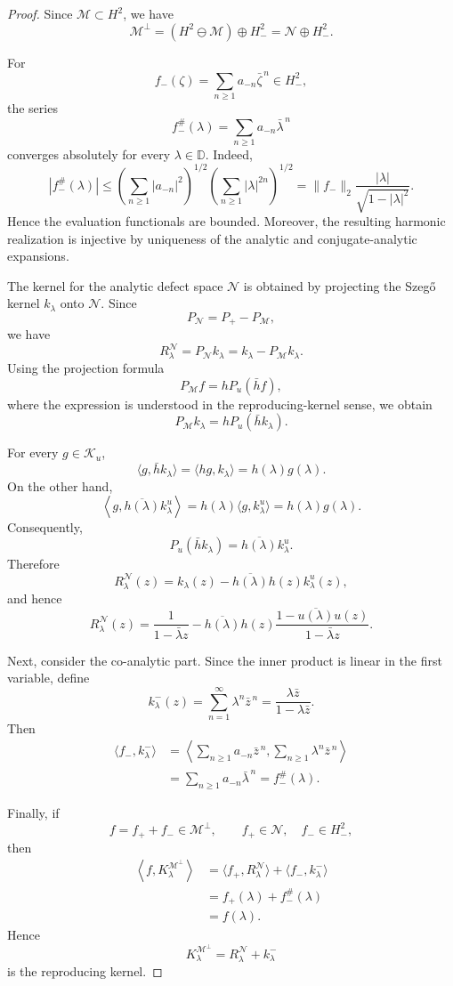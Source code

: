 \documentclass[10pt,a4paper]{amsart}
\def \D{\mathbb{D}}
\newcommand{\clm}{\mathcal{M}}
\newcommand{\cln}{\mathcal{N}}
\newcommand{\clk}{\mathcal{K}}
\numberwithin{equation}{section}
\begin{document}
\begin{proof}
Since $\clm\subset H^2$, we have
\[
\clm^\perp
=(H^2\ominus\clm)\oplus H_{-}^2
=\cln\oplus H_{-}^2.
\]

For
\[
f_{-}(\zeta)=\sum_{n\geq1}a_{-n}\bar\zeta^{\,n}\in H_{-}^2,
\]
the series
\[
f_{-}^\#(\lambda)
=
\sum_{n\geq1}a_{-n}\bar\lambda^{\,n}
\]
converges absolutely for every $\lambda\in\D$. Indeed,
\[
|f_{-}^\#(\lambda)|
\leq
\left(\sum_{n\geq1}|a_{-n}|^2\right)^{1/2}
\left(\sum_{n\geq1}|\lambda|^{2n}\right)^{1/2}
=
\|f_{-}\|_2
\frac{|\lambda|}{\sqrt{1-|\lambda|^2}}.
\]
Hence the evaluation functionals are bounded. Moreover, the resulting
harmonic realization is injective by uniqueness of the analytic and
conjugate-analytic expansions.

The kernel for the analytic defect space $\cln$ is obtained by projecting
the Szeg\H{o} kernel $k_\lambda$ onto $\cln$. Since
\[
P_\cln=P_+-P_\clm,
\]
we have
\[
R_\lambda^\cln
=
P_\cln k_\lambda
=
k_\lambda-P_\clm k_\lambda.
\]
Using the projection formula
\[
P_\clm f=hP_u(\bar h f),
\]
where the expression is understood in the reproducing-kernel sense, we
obtain
\[
P_\clm k_\lambda
=
hP_u(\bar h k_\lambda).
\]

For every $g\in\clk_u$,
\[
\langle g,\bar h k_\lambda\rangle
=
\langle hg,k_\lambda\rangle
=
h(\lambda)g(\lambda).
\]
On the other hand,
\[
\left\langle
g,\overline{h(\lambda)}k_\lambda^u
\right\rangle
=
h(\lambda)\langle g,k_\lambda^u\rangle
=
h(\lambda)g(\lambda).
\]
Consequently,
\[
P_u(\bar h k_\lambda)
=
\overline{h(\lambda)}k_\lambda^u.
\]
Therefore
\[
R_\lambda^\cln(z)
=
k_\lambda(z)
-
\overline{h(\lambda)}h(z)k_\lambda^u(z),
\]
and hence
\[
R_\lambda^\cln(z)
=
\frac{1}{1-\bar\lambda z}
-
\overline{h(\lambda)}h(z)
\frac{1-\overline{u(\lambda)}u(z)}
     {1-\bar\lambda z}.
\]

Next, consider the co-analytic part. Since the inner product is linear
in the first variable, define
\[
k_\lambda^-(z)
=
\sum_{n=1}^{\infty}\lambda^n\bar z^{\,n}
=
\frac{\lambda\bar z}{1-\lambda\bar z}.
\]
Then
\[
\begin{aligned}
\langle f_{-},k_\lambda^-\rangle
&=
\left\langle
\sum_{n\geq1}a_{-n}\bar z^{\,n},
\sum_{n\geq1}\lambda^n\bar z^{\,n}
\right\rangle  \\
&=
\sum_{n\geq1}a_{-n}\bar\lambda^{\,n}
=
f_{-}^\#(\lambda).
\end{aligned}
\]

Finally, if
\[
f=f_{+}+f_{-}\in\clm^\perp,
\qquad
f_{+}\in\cln,\quad f_{-}\in H_{-}^2,
\]
then
\[
\begin{aligned}
\left\langle f,K_\lambda^{\clm^\perp}\right\rangle
&=
\langle f_{+},R_\lambda^\cln\rangle
+
\langle f_{-},k_\lambda^-\rangle \\
&=
f_{+}(\lambda)+f_{-}^\#(\lambda) \\
&=
f(\lambda).
\end{aligned}
\]
Hence
\[
K_\lambda^{\clm^\perp}
=
R_\lambda^\cln+k_\lambda^-
\]
is the reproducing kernel.
\end{proof}
\end{document}
